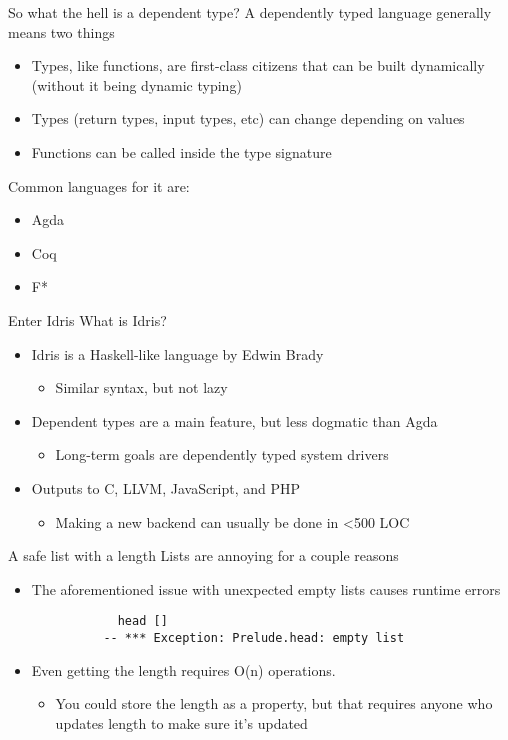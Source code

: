 \documentclass{beamer}
\begin{document}
\begin{frame}{So what the hell is a dependent type? }
 	\transdissolve
	A dependently typed language generally means two things
	\begin{itemize}	
		\pause
		\item Types, like functions, are first-class citizens that can be built dynamically (without it being dynamic typing)
		\pause
		\item Types (return types, input types, etc) can change depending on values
		\pause
                \item Functions can be called inside the type signature
	\end{itemize}
	\pause
	Common languages for it are: 
	\begin{itemize}	
		\item Agda
		\item Coq 
		\item F*
	\end{itemize}
\end{frame}
\begin{frame}{Enter Idris}
	\transdissolve
	What is Idris? 
	\begin{itemize}
		\pause
		\item Idris is a Haskell-like language by Edwin Brady \begin{itemize}
				\item Similar syntax, but not lazy
	\end{itemize}
	\pause
\item Dependent types are a main feature, but less dogmatic than Agda \begin{itemize}
		\item Long-term goals are dependently typed system drivers
	\end{itemize}
		\pause
		\item Outputs to C, LLVM, JavaScript, and PHP \begin{itemize}
				\item Making a new backend can usually be done in \textless 500 LOC
			\end{itemize}
	\end{itemize}
\end{frame}
\begin{frame}[fragile]{A safe list with a length}
	\transdissolve
	Lists are annoying for a couple reasons
	\begin{itemize}
		\pause
		\item The aforementioned issue with unexpected empty lists causes runtime errors
		\pause
		\begin{lstlisting} 
			head [] 
		  -- *** Exception: Prelude.head: empty list
		\end{lstlisting}
	\pause
	\item Even getting the length requires O(n) operations.\begin{itemize}
			\pause
			\item You could store the length as a property, but that requires anyone who updates length to make sure it's updated
		\end{itemize}
		
	\end{itemize}
	
\end{frame}
\end{document}
